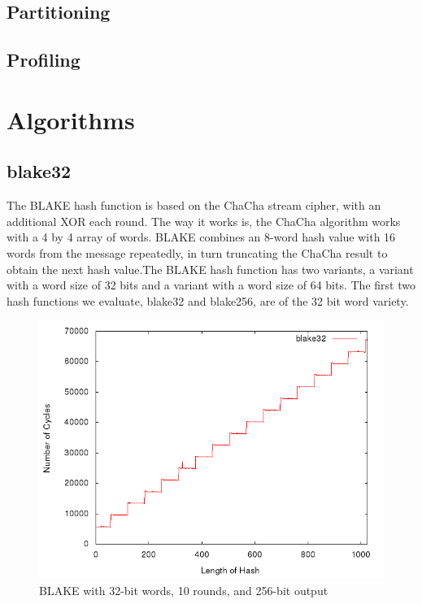 \documentclass[10pt,a4paper]{article}
\begin{document}
\subsection{Partitioning}
\subsection{Profiling}



\section{Algorithms}
\subsection{blake32}
The BLAKE hash function is based on the ChaCha stream cipher, with an additional XOR each round. The way it works is,
the ChaCha algorithm works with a 4 by 4 array of words. BLAKE combines an 8-word hash value with 16 words from the 
message repeatedly, in turn truncating the ChaCha result to obtain the next hash value.The BLAKE hash function has two variants, 
a variant with a word size of 32 bits and a variant with a word size of 64 bits. The first two hash functions we evaluate, blake32 and blake256, are 
of the 32 bit word variety.

\begin{figure}[H]
    \begin{center}
        \includegraphics[scale=0.5]{images/blake32.png} 
        \caption{BLAKE with 32-bit words, 10 rounds, and 256-bit output}
    \end{center}
\end{figure}
\end{document}
